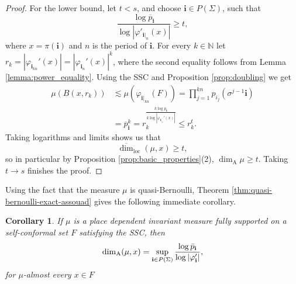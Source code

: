 \documentclass{PRM}
\newcommand{\field}[1]{\mathbb{#1}}
\newcommand{\N}{\field{N}}
\newcommand{\updim}{\overline{\dim}}
\theoremstyle{plain}
\newtheorem{cor}[thm]{Corollary}
\theoremstyle{definition}
\theoremstyle{remark}
\begin{document}
\begin{proof}
For the lower bound, let $t<s$, and choose $\mathbf{i}\in P(\Sigma)$, such that
\begin{equation*}
    \frac{\log \overline{p}_{\mathbf{i}}}{\log |\varphi'_{\mathbf{i}|_{n}}(x)|}\geq t,
\end{equation*}
where $x=\pi(\mathbf{i})$ and $n$ is the period of $\mathbf{i}$. For every $k\in\N$ let $r_k=|\varphi_{\mathbf{i}_{kn}}'(x)|=|\varphi_{\mathbf{i}_{n}}'(x)|^k$, where the second equality follows from Lemma \ref{lemma:power_equality}. Using the SSC and Proposition \ref{prop:doubling} we get
\begin{align*}
    \mu(B(x,r_k))&\lesssim \mu(\varphi_{\mathbf{i}|_{kn}}(F))=\prod_{j=1}^{kn}p_{i_j}(\sigma^{j-1}\mathbf{i})\\
    &=\overline{p}_{\mathbf{i}}^k=r_k^\frac{k\log \overline{p}_{\mathbf{i}}}{k\log |\varphi_{\mathbf{i}|_{n}}'(x)|}\leq r_k^t.
\end{align*}
Taking logarithms and limits shows us that
\begin{equation*}
    \updim_{\text{loc}}(\mu,x)\geq t,
\end{equation*}
so in particular by Proposition \ref{prop:basic_properties}(2),  $\dim_{\mathrm{A}}\mu\geq t$. Taking $t\to s$ finishes the proof.
\end{proof}
Using the fact that the measure $\mu$ is quasi-Bernoulli, Theorem \ref{thm:quasi-bernoulli-exact-assouad} gives the following immediate corollary.
\begin{cor}\label{cor:invmeas-pw}
If $\mu$ is a place dependent invariant measure fully supported on a self-conformal set $F$ satisfying the SSC, then
\begin{equation*}
    \dim_{\mathrm{A}}(\mu,x)=\sup_{\mathbf{i}\in P(\Sigma)}\frac{\log \Bar{p}_{\mathbf{i}}}{\log|\varphi'_{\mathbf{i}}|},
\end{equation*}
for $\mu$-almost every $x\in F$
\end{cor}
\end{document}
